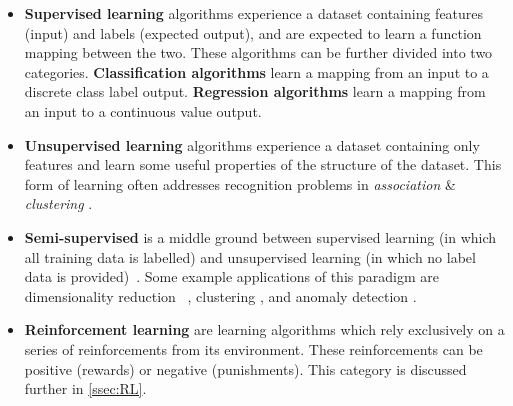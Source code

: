 \begin{itemize}
    \item \textbf{Supervised learning} algorithms experience a dataset
    containing features (input) and labels (expected output), and are expected
    to learn a function mapping between the two. These algorithms can be further
    divided into two categories. \textbf{Classification algorithms} learn a
    mapping from an input to a discrete class label output. \textbf{Regression
    algorithms} learn a mapping from an input to a continuous value output.


    \item \textbf{Unsupervised learning} algorithms experience a dataset
    containing only features and learn some useful properties of the structure
    of the dataset. This form of learning often addresses recognition problems
    in \textit{association} \& \textit{clustering} \cite{barlow1999ul}.

    \item \textbf{Semi-supervised} is a middle ground between supervised
    learning (in which all training data is labelled) and unsupervised learning
    (in which no label data is provided)~\cite{books/mit/06/CSZ2006}. Some
    example applications of this paradigm are dimensionality reduction
    ~\cite{Zhang2007}, clustering \cite{Bair2013}, and anomaly detection
    \cite{DBLP:journals/corr/abs-1805-06725}.

    \item \textbf{Reinforcement learning} are learning algorithms which rely
    exclusively on a series of reinforcements from its environment. These
    reinforcements can be positive (rewards) or negative (punishments). This
    category is discussed further in \autoref{ssec:RL}.
\end{itemize}

